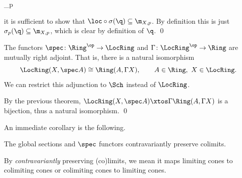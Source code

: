         {\sigma}{\phi_p}{}{\loc}

    it is sufficient to show that $\loc\circ\sigma(\q)\subseteq\m_{X,p}$.
    By definition this is just $\sigma_p(\q)\subseteq\m_{X,p}$, which is clear by definition of $\q$.
    \qed

\eproof

\bthrm[name={specglobsectionadj}]

    The functors $\spec\colon\Ring^\op\to\LocRing$ and $\Gamma\colon\LocRing^\op\to\Ring$ are mutually right adjoint.
    That is, there is a natural isomorphism
    $$ \LocRing(X,\spec A) \cong \Ring(A,\Gamma X),\qquad A\in\Ring,\ X\in\LocRing . $$
    We can restrict this adjunction to $\Sch$ instead of $\LocRing$.

\ethrm

\bproof

    By the previous theorem, $\LocRing(X,\spec A)\xtos\Gamma\Ring(A,\Gamma X)$ is a bijection, thus a natural isomorphism.
    \qed

\eproof

An immediate corollary is the following.

\bcoro[name={specsectlim}]

    The global sections and $\spec$ functors contravariantly preserve colimits.

\ecoro

\bnote

    By {\it contravariantly\/} preserving (co)limits, we mean it maps limiting cones to colimiting cones or colimiting cones
    to limiting cones.

\enote

